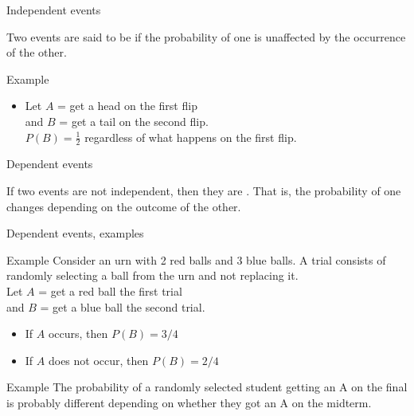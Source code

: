 \documentclass[xcolor=table, aspectratio=169, bigger]{beamer}
\begin{document}
\begin{frame}{Independent events}
\begin{block}{}
Two events are said to be  if the probability of one is unaffected by the occurrence of the other.
\end{block}

\pause

\begin{exampleblock}{Example}
\begin{itemize}
\item Let $A$ = get a head on the first flip\\
and $B$ = get a tail on the second flip.\\
$P(B) = \frac 1 2$ regardless of what happens on the first flip.
\end{itemize}
\end{exampleblock}
\end{frame}

\begin{frame}{Dependent events}
\begin{block}{}
If two events are not independent, then they are . That is, the probability of one changes depending on the outcome of the other.
\end{block}
\end{frame}

\begin{frame}{Dependent events, examples}

\begin{exampleblock}{Example}
Consider an urn with 2 red balls and 3 blue balls. A trial consists of randomly selecting a ball from the urn and not replacing it.\\
\pause
\medskip Let $A$ = get a red ball the first trial\\
 and $B$ = get a blue ball the second trial.
\begin{itemize}
\pause
\item If $A$ occurs, then $P(B) = 3 / 4$
\pause
\item If $A$ does not occur, then $P(B) =  2 / 4$
\end{itemize}
\end{exampleblock}

\pause

\begin{exampleblock}{Example}
The probability of a randomly selected student getting an A on the final is probably different depending on whether they got an A on the midterm.
\end{exampleblock}
\end{frame}
\end{document}
